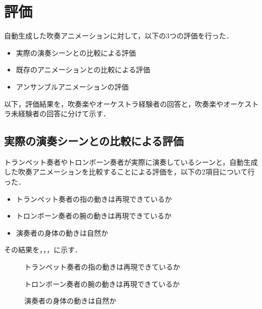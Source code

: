 \section{評価} \label{sec:review}
自動生成した吹奏アニメーションに対して，以下の3つの評価を行った．
\begin{itemize}
	\item 実際の演奏シーンとの比較による評価
	\item 既存のアニメーションとの比較による評価
	\item アンサンブルアニメーションの評価
\end{itemize}
以下，評価結果を，吹奏楽やオーケストラ経験者の回答と，吹奏楽やオーケストラ未経験者の回答に分けて示す．

\newpage
\subsection{実際の演奏シーンとの比較による評価}
トランペット奏者やトロンボーン奏者が実際に演奏しているシーンと，自動生成した吹奏アニメーションを比較することによる評価を，以下の2項目について行った．
\begin{itemize}
	\item トランペット奏者の指の動きは再現できているか
	\item トロンボーン奏者の腕の動きは再現できているか
	\item 演奏者の身体の動きは自然か
\end{itemize}
その結果を，，，に示す．
\begin{figure}[!h]
	\centering
	\hspace{2mm}
	\caption{トランペット奏者の指の動きは再現できているか}
	\label{fig:Q1-tp}
\end{figure}
\begin{figure}[!h]
	\centering
	\caption{トロンボーン奏者の腕の動きは再現できているか}
	\label{fig:Q1-tb}
\end{figure}
\begin{figure}[!h]
	\centering
	\caption{演奏者の身体の動きは自然か}
	\label{fig:Q1-tptb}
\end{figure}

